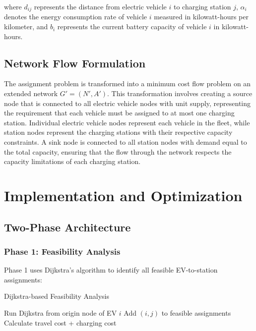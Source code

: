 \documentclass[12pt,a4paper]{article}
\begin{document}
where $d_{ij}$ represents the distance from electric vehicle $i$ to charging station $j$, $\alpha_i$ denotes the energy consumption rate of vehicle $i$ measured in kilowatt-hours per kilometer, and $b_i$ represents the current battery capacity of vehicle $i$ in kilowatt-hours.

\subsection{Network Flow Formulation}

The assignment problem is transformed into a minimum cost flow problem on an extended network $G' = (N', A')$. This transformation involves creating a source node that is connected to all electric vehicle nodes with unit supply, representing the requirement that each vehicle must be assigned to at most one charging station. Individual electric vehicle nodes represent each vehicle in the fleet, while station nodes represent the charging stations with their respective capacity constraints. A sink node is connected to all station nodes with demand equal to the total capacity, ensuring that the flow through the network respects the capacity limitations of each charging station.

\section{Implementation and Optimization}

\subsection{Two-Phase Architecture}

\subsubsection{Phase 1: Feasibility Analysis}

Phase 1 uses Dijkstra's algorithm to identify all feasible EV-to-station assignments:

\begin{algorithm}[H]
\caption{Dijkstra-based Feasibility Analysis}
\begin{algorithmic}[1]
    \STATE Run Dijkstra from origin node of EV $i$
            \STATE Add $(i,j)$ to feasible assignments
            \STATE Calculate travel cost + charging cost
        \ENDIF
    \ENDFOR
\ENDFOR
\end{algorithmic}
\end{algorithm}
\end{document}
